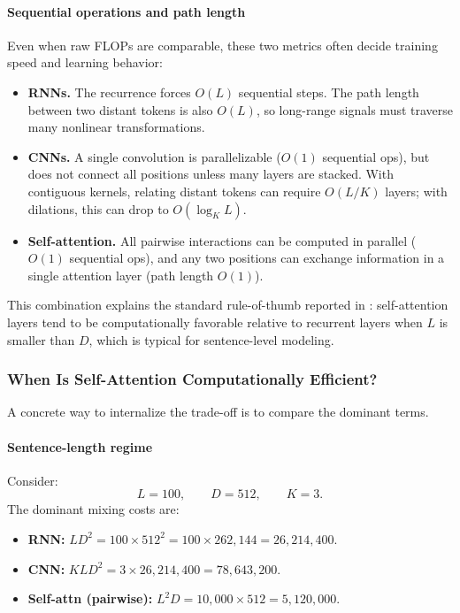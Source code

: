 \paragraph{Sequential operations and path length}
\noindent
Even when raw FLOPs are comparable, these two metrics often decide training speed and learning behavior:
\begin{itemize}
	\item \textbf{RNNs.} The recurrence forces \(O(L)\) sequential steps.
	The path length between two distant tokens is also \(O(L)\), so long-range signals must traverse many nonlinear transformations.
	\item \textbf{CNNs.} A single convolution is parallelizable (\(O(1)\) sequential ops), but does not connect all positions unless many layers are stacked.
	With contiguous kernels, relating distant tokens can require \(O(L/K)\) layers; with dilations, this can drop to \(O(\log_K L)\).
	\item \textbf{Self-attention.} All pairwise interactions can be computed in parallel (\(O(1)\) sequential ops),
	and any two positions can exchange information in a single attention layer (path length \(O(1)\)).
\end{itemize}

\noindent
This combination explains the standard rule-of-thumb reported in \cite{vaswani2017_attention}:
self-attention layers tend to be computationally favorable relative to recurrent layers when \(L\) is smaller than \(D\), which is typical for sentence-level modeling.

\subsubsection{When Is Self-Attention Computationally Efficient?}
\label{subsubsec:chapter17_when_attention_efficient}

\noindent
A concrete way to internalize the trade-off is to compare the dominant terms.

\paragraph{Sentence-length regime}
\noindent
Consider:
\[
L = 100, \qquad D = 512, \qquad K = 3.
\]
The dominant mixing costs are:
\begin{itemize}
	\item \textbf{RNN:} \(LD^2 = 100 \times 512^2 = 100 \times 262{,}144 = 26{,}214{,}400.\)
	\item \textbf{CNN:} \(KLD^2 = 3 \times 26{,}214{,}400 = 78{,}643{,}200.\)
	\item \textbf{Self-attn (pairwise):} \(L^2D = 10{,}000 \times 512 = 5{,}120{,}000.\)
\end{itemize}

